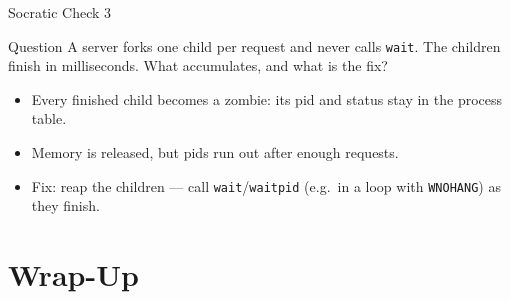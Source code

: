 \documentclass[aspectratio=169]{beamer}
\begin{document}
\begin{frame}{Socratic Check 3}
  \begin{block}{Question}
    A server forks one child per request and never calls \texttt{wait}. The
    children finish in milliseconds. What accumulates, and what is the fix?
  \end{block}
  \vspace{0.25cm}
  \begin{itemize}
    \item Every finished child becomes a zombie: its pid and status stay in
      the process table.
    \item Memory is released, but pids run out after enough requests.
    \item Fix: reap the children --- call \texttt{wait}/\texttt{waitpid}
      (e.g.\ in a loop with \texttt{WNOHANG}) as they finish.
  \end{itemize}
\end{frame}

\section{Wrap-Up}
\end{document}
